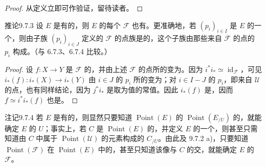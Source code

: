 \begin{proof}
从定义立即可作验证，留待读者。
\end{proof}
\begin{SGAresult}{推论}{9.7.3}
设 $E$ 是有的，则 $E$ 的每个 $\mathscr F$ 也有。更准确地，若 $(p_i)_{i\in I}$ 是 $E$ 的一个，则由子族 $(p_i)_{i\in J}$ 定义的 $\mathscr F$ 的点族是的，这个子族由那些来自 $\mathscr F$ 的点的 $p_i$ 构成。（与 6.7.3、6.7.4 比较。）
\end{SGAresult}
\begin{proof}
设 $f:X\to Y$ 是 $\mathscr F$ 的，并由上述 $\mathscr F$ 的点所的变为。因为 $i^*i_*\simeq\operatorname{id}_{\mathscr F}$，可见 $i_*(f):i_*(X)\to i_*(Y)$ 由 $i\in J$ 的 $p_i$ 所的变为；对 $i\in I-J$ 的 $p_i$，即来自 $\mathscr U$ 的点，也有同样结论，因为 $j^*i_*$ 是取为值的常值。因此 $i_*(f)$ 是，因而 $f\simeq i^*i_*(f)$ 也是。
\end{proof}
\begin{SGAresult}{注记}{9.7.4}
若 $E$ 是有的，则显然只要知道 $\operatorname{Point}(E)$ 的 $\operatorname{Point}(E_{/U})$ 的，就能确定 $E$ 的 $U$；事实上，若 $C$ 是 $\operatorname{Point}(E)$ 的，并定义 $E$ 的一个，则甚至只需知道由 $C$ 中属于 $\operatorname{Point}(\mathscr U)$ 的元素构成的 $C_{/U}$。由此及 9.7.2 a)，只要知道 $\operatorname{Point}(\mathscr F)$ 在 $\operatorname{Point}(E)$ 中的，甚至只知道该像与 $C$ 的交，就能确定 $E$ 的 $\mathscr F$。
\end{SGAresult}
